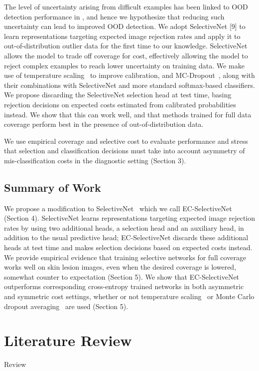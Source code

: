 The level of uncertainty arising from difficult examples has been linked to OOD detection performance in \citep{aleatoric_relation_proof}, and hence we hypothesize that reducing such uncertainty can lead to improved OOD detection. We adopt SelectiveNet [9] to learn representations targeting expected image rejection rates and apply it to out-of-distribution outlier data for the first time to our knowledge. SelectiveNet allows the model to trade off coverage for cost, effectively allowing the model to reject complex examples to reach lower uncertainty on training data. We make use of temperature scaling~\citep{guo2017calibration} to improve calibration, and MC-Dropout~\citep{Gal2016}, along with their combinations with SelectiveNet and more standard softmax-based classifiers. We propose discarding the SelectiveNet selection head at test time, basing rejection decisions on expected costs estimated from calibrated probabilities instead. We show that this can work well, and that methods trained for full data coverage perform best in the presence of out-of-distribution data.

We use empirical coverage and selective cost to evaluate performance and stress that selection and classification decisions must take into account asymmetry of mis-classification costs in the diagnostic setting (Section 3). 

\subsection{Summary of Work}
\label{subsec:selective_summary_of_work}
We propose a modification to SelectiveNet~\citep{Geifman2019} which we call EC-SelectiveNet (Section 4). SelectiveNet learns representations targeting expected image rejection rates by using two additional heads, a selection head and an auxiliary head, in addition to the usual predictive head; EC-SelectiveNet discards these additional heads at test time and makes selection decisions based on expected costs instead. 
We provide empirical evidence that training selective networks for full coverage works well on skin lesion images, even when the desired coverage is lowered, somewhat counter to expectation (Section 5). We show that EC-SelectiveNet outperforms corresponding cross-entropy trained networks in both asymmetric and symmetric cost settings, whether or not temperature scaling~\citep{guo2017calibration} or Monte Carlo dropout averaging~\citep{Gal2016} are used (Section 5).



\section{Literature Review}
\label{sec:selective_review}
Review



